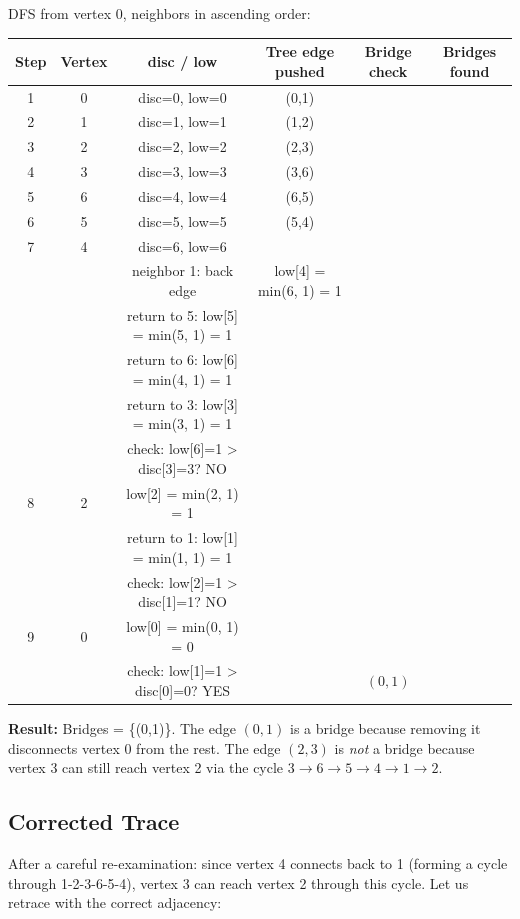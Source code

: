 DFS from vertex 0, neighbors in ascending order:

\begin{center}
\begin{tabular}{cccccc}
\toprule
Step & Vertex & disc / low & Tree edge pushed & Bridge check & Bridges found \\
\midrule
1 & 0 & disc=0, low=0 & (0,1) & & \\
2 & 1 & disc=1, low=1 & (1,2) & & \\
3 & 2 & disc=2, low=2 & (2,3) & & \\
4 & 3 & disc=3, low=3 & (3,6) & & \\
5 & 6 & disc=4, low=4 & (6,5) & & \\
6 & 5 & disc=5, low=5 & (5,4) & & \\
7 & 4 & disc=6, low=6 & & & \\
& & neighbor 1: back edge & low[4] = min(6, 1) = 1 & & \\
& & return to 5: low[5] = min(5, 1) = 1 & & & \\
& & return to 6: low[6] = min(4, 1) = 1 & & & \\
& & return to 3: low[3] = min(3, 1) = 1 & & & \\
& & check: low[6]=1 > disc[3]=3? NO & & & \\
8 & 2 & low[2] = min(2, 1) = 1 & & & \\
& & return to 1: low[1] = min(1, 1) = 1 & & & \\
& & check: low[2]=1 > disc[1]=1? NO & & & \\
9 & 0 & low[0] = min(0, 1) = 0 & & & \\
& & check: low[1]=1 > disc[0]=0? YES & & $(0,1)$ \\
\bottomrule
\end{tabular}
\end{center}

\textbf{Result:} Bridges = \{(0,1)\}. The edge $(0,1)$ is a bridge because removing it disconnects vertex 0 from the rest. The edge $(2,3)$ is \emph{not} a bridge because vertex 3 can still reach vertex 2 via the cycle $3 \to 6 \to 5 \to 4 \to 1 \to 2$.

\subsection{Corrected Trace}

After a careful re-examination: since vertex 4 connects back to 1 (forming a cycle through 1-2-3-6-5-4), vertex 3 can reach vertex 2 through this cycle. Let us retrace with the correct adjacency:

